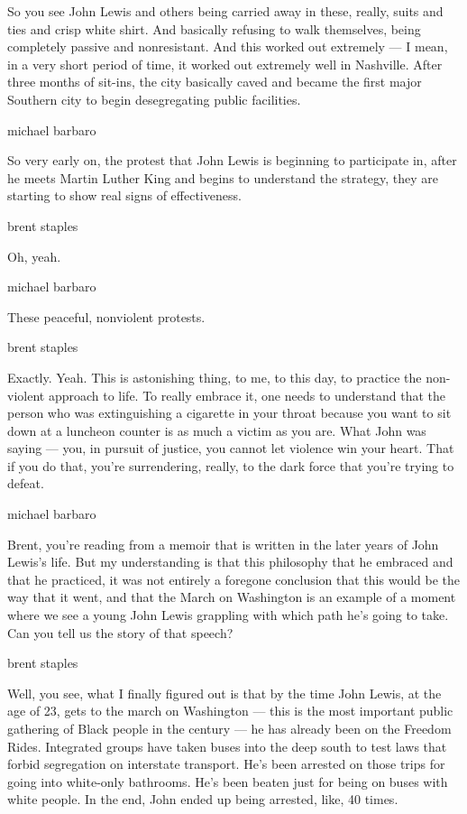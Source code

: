 So you see John Lewis and others being carried away in these, really,
suits and ties and crisp white shirt. And basically refusing to walk
themselves, being completely passive and nonresistant. And this worked
out extremely --- I mean, in a very short period of time, it worked out
extremely well in Nashville. After three months of sit-ins, the city
basically caved and became the first major Southern city to begin
desegregating public facilities.

michael barbaro

So very early on, the protest that John Lewis is beginning to
participate in, after he meets Martin Luther King and begins to
understand the strategy, they are starting to show real signs of
effectiveness.

brent staples

Oh, yeah.

michael barbaro

These peaceful, nonviolent protests.

brent staples

Exactly. Yeah. This is astonishing thing, to me, to this day, to
practice the non-violent approach to life. To really embrace it, one
needs to understand that the person who was extinguishing a cigarette in
your throat because you want to sit down at a luncheon counter is as
much a victim as you are. What John was saying --- you, in pursuit of
justice, you cannot let violence win your heart. That if you do that,
you're surrendering, really, to the dark force that you're trying to
defeat.

michael barbaro

Brent, you're reading from a memoir that is written in the later years
of John Lewis's life. But my understanding is that this philosophy that
he embraced and that he practiced, it was not entirely a foregone
conclusion that this would be the way that it went, and that the March
on Washington is an example of a moment where we see a young John Lewis
grappling with which path he's going to take. Can you tell us the story
of that speech?

brent staples

Well, you see, what I finally figured out is that by the time John
Lewis, at the age of 23, gets to the march on Washington --- this is the
most important public gathering of Black people in the century --- he
has already been on the Freedom Rides. Integrated groups have taken
buses into the deep south to test laws that forbid segregation on
interstate transport. He's been arrested on those trips for going into
white-only bathrooms. He's been beaten just for being on buses with
white people. In the end, John ended up being arrested, like, 40 times.

